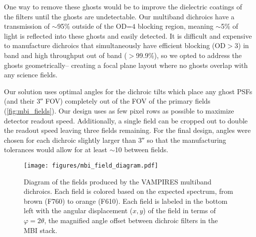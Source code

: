 One way to remove these ghosts would be to improve the dielectric coatings of the filters until the ghosts are undetectable. Our multiband dichroics have a transmission of $\sim$95\% outside of the OD=$4$ blocking region, meaning $\sim$5\% of light is reflected into these ghosts and easily detected. It is difficult and expensive to manufacture dichroics that simultaneously have efficient blocking (OD$>$3) in band and high throughput out of band ($>$99.9\%), so we opted to address the ghosts geometrically-- creating a focal plane layout where no ghosts overlap with any science fields.

Our solution uses optimal angles for the dichroic tilts which place any ghost PSFs (and their \ang{;;3} FOV) completely out of the FOV of the primary fields (\autoref{fig:mbi_fields}). Our design uses as few pixel rows as possible to maximize detector readout speed. Additionally, a single field can be cropped out to double the readout speed leaving three fields remaining. For the final design, angles were chosen for each dichroic slightly larger than \ang{;;3} so that the manufacturing tolerances would allow for at least $\sim$\SI{10}{\pixel} between fields.

\begin{figure}
    \centering
    \texttt{[image: figures/mbi\_field\_diagram.pdf]}
    \caption{Diagram of the fields produced by the VAMPIRES multiband dichroics. Each field is colored based on the expected spectrum, from brown (F760) to orange (F610). Each field is labeled in the bottom left with the angular displacement ($x,y$) of the field in terms of $\varphi=2\theta$, the magnified angle offset between dichroic filters in the MBI stack.\label{fig:mbi_fields}}
\end{figure}